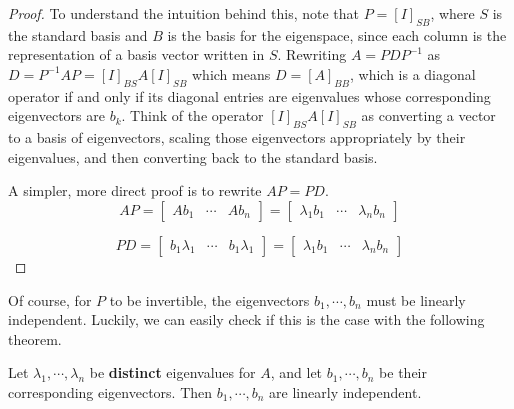 \begin{proof}

To understand the intuition behind this, note that $P = [I]_{SB}$, where $S$ is the standard basis and $B$ is the basis for the eigenspace, since each column is the representation of a basis vector written in $S$. Rewriting $A = PDP^{-1}$ as $D = P^{-1}AP = [I]_{BS} A [I]_{SB}$ which means $D = [A]_{BB}$, which is a diagonal operator if and only if its diagonal entries are eigenvalues whose corresponding eigenvectors are $b_{k}$. Think of the operator $[I]_{BS} A [I]_{SB}$ as converting a vector to a basis of eigenvectors, scaling those eigenvectors appropriately by their eigenvalues, and then converting back to the standard basis. 

A simpler, more direct proof is to rewrite $AP = PD$. 
$$AP = \begin{bmatrix}
Ab_{1} & \cdots & Ab_{n}
\end{bmatrix} = \begin{bmatrix}
\lambda_{1} b_{1} & \cdots & \lambda_{n} b_{n}
\end{bmatrix}$$

$$PD = \begin{bmatrix}
b_{1} \lambda_{1} & \cdots & b_{1} \lambda_{1}
\end{bmatrix} = \begin{bmatrix}
\lambda_{1} b_{1} & \cdots & \lambda_{n} b_{n}
\end{bmatrix}$$
\end{proof}

Of course, for $P$ to be invertible, the eigenvectors $b_{1}, \cdots, b_{n}$ must be linearly independent. Luckily, we can easily check if this is the case with the following theorem. 

\begin{theorem}
Let $\lambda_{1}, \cdots, \lambda_{n}$ be \textbf{distinct} eigenvalues for $A$, and let $b_{1}, \cdots, b_{n}$ be their corresponding eigenvectors. Then $b_{1}, \cdots, b_{n}$ are linearly independent. 
\end{theorem}

